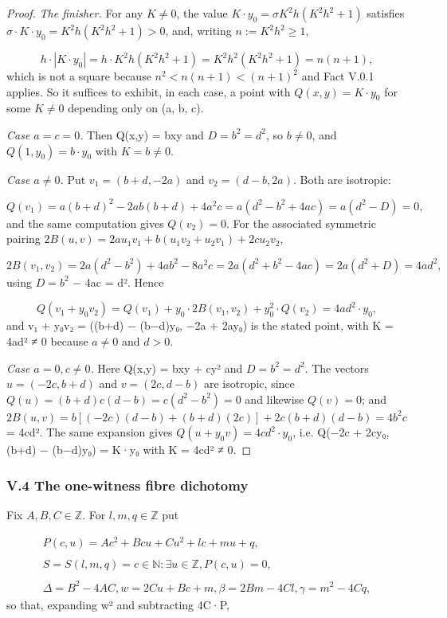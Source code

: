 \begin{proof}
\emph{The finisher.} For any $K ≠ 0$, the value $K·y_{0} = σK^{2}h(K^{2}h^{2} + 1)$ satisfies $σ·K·y_{0} = K^{2}h(K^{2}h^{2} + 1) > 0$, and, writing $n := K^{2}h^{2} ≥ 1$,

\[
h·|K·y_{0}| = h·K^{2}h(K^{2}h^{2} + 1) = K^{2}h^{2}(K^{2}h^{2} + 1) = n(n + 1),
\]
which is not a square because $n^{2} < n(n+1) < (n+1)^{2}$ and Fact V.0.1 applies. So it suffices to exhibit, in each case, a point with $Q(x,y) = K·y_{0}$ for some $K ≠ 0$ depending only on (a, b, c).

\emph{Case $a = c = 0$.} Then Q(x,y) = bxy and $D = b^{2} = d^{2}$, so $b ≠ 0$, and $Q(1, y_{0}) = b·y_{0}$ with $K = b ≠ 0$.

\emph{Case $a ≠ 0$.} Put $v_{1} = (b+d, −2a)$ and $v_{2} = (d−b, 2a)$. Both are isotropic:

\[
Q(v_{1}) = a(b+d)^{2} − 2ab(b+d) + 4a^{2}c = a(d^{2} − b^{2} + 4ac) = a(d^{2} − D) = 0,
\]
and the same computation gives $Q(v_{2}) = 0$. For the associated symmetric pairing $2B(u,v) = 2a u_{1}v_{1} + b(u_{1}v_{2} + u_{2}v_{1}) + 2c u_{2}v_{2}$,

\[
2B(v_{1},v_{2}) = 2a(d^{2} − b^{2}) + 4ab^{2} − 8a^{2}c = 2a(d^{2} + b^{2} − 4ac) = 2a(d^{2} + D) = 4ad^{2},
\]
using $D = b^{2}$ − 4ac = d². Hence

\[
Q(v_{1} + y_{0}v_{2}) = Q(v_{1}) + y_{0}·2B(v_{1},v_{2}) + y_{0}^{2}·Q(v_{2}) = 4ad^{2}·y_{0},
\]
and v₁ + y₀v₂ = ((b+d) − (b−d)y₀, −2a + 2ay₀) is the stated point, with K = 4ad² ≠ 0 because $a ≠ 0$ and $d > 0$.

\emph{Case $a = 0, c ≠ 0$.} Here Q(x,y) = bxy + cy² and $D = b^{2} = d^{2}$. The vectors $u = (−2c, b+d)$ and $v = (2c, d−b)$ are isotropic, since $Q(u) = (b+d)c(d−b) = c(d^{2} − b^{2}) = 0$ and likewise $Q(v) = 0$; and $2B(u,v) = b[(−2c)(d−b) + (b+d)(2c)] + 2c(b+d)(d−b) = 4b^{2}c$ = 4cd². The same expansion gives $Q(u + y_{0}v) = 4cd^{2}·y_{0}$, i.e. Q(−2c + 2cy₀, (b+d) − (b−d)y₀) = K·y₀ with K = 4cd² ≠ 0.

\end{proof}
\subsubsection*{V.4 The one-witness fibre dichotomy}
Fix $A, B, C ∈ ℤ$. For $l, m, q ∈ ℤ$ put

\[
\begin{gathered}
P(c,u) = A c^{2} + B cu + C u^{2} + l c + m u + q, \\ \\
S = S(l,m,q) = {c ∈ ℕ : ∃ u ∈ ℤ, P(c,u) = 0}, \\ \\
Δ = B^{2} − 4AC,  w = 2Cu + Bc + m,  β = 2Bm − 4Cl,  γ = m^{2} − 4Cq,
\end{gathered}
\]
so that, expanding w² and subtracting 4C·P,

